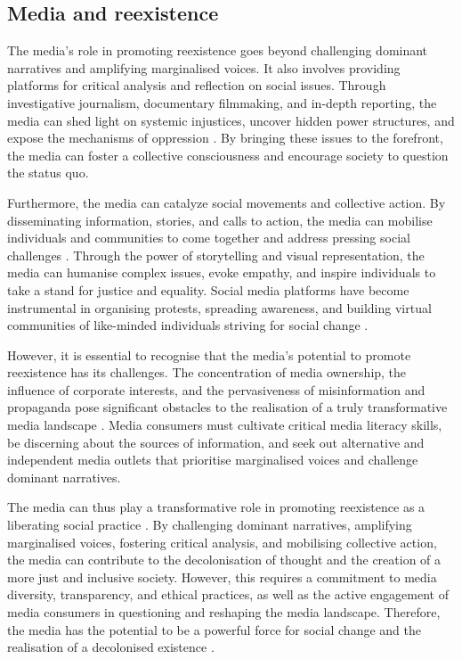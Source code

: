 \documentclass[english]{textolivre}
\begin{document}
\subsection{Media and reexistence}\label{sec-fmt-manuscrito}
The media’s role in promoting reexistence goes beyond challenging dominant narratives and amplifying marginalised voices. It also involves providing platforms for critical analysis and reflection on social issues. Through investigative journalism, documentary filmmaking, and in-depth reporting, the media can shed light on systemic injustices, uncover hidden power structures, and expose the mechanisms of oppression \cite{mcchesney2004problem}. By bringing these issues to the forefront, the media can foster a collective consciousness and encourage society to question the status quo.

Furthermore, the media can catalyze social movements and collective action. By disseminating information, stories, and calls to action, the media can mobilise individuals and communities to come together and address pressing social challenges \cite{couldry2012}. Through the power of storytelling and visual representation, the media can humanise complex issues, evoke empathy, and inspire individuals to take a stand for justice and equality. Social media platforms have become instrumental in organising protests, spreading awareness, and building virtual communities of like-minded individuals striving for social change \cite{hooks1996}.

However, it is essential to recognise that the media's potential to promote reexistence has its challenges. The concentration of media ownership, the influence of corporate interests, and the pervasiveness of misinformation and propaganda pose significant obstacles to the realisation of a truly transformative media landscape \cite{herman2002}. Media consumers must cultivate critical media literacy skills, be discerning about the sources of information, and seek out alternative and independent media outlets that prioritise marginalised voices and challenge dominant narratives.

The media can thus play a transformative role in promoting reexistence as a liberating social practice \cite{couldry2012}. By challenging dominant narratives, amplifying marginalised voices, fostering critical analysis, and mobilising collective action, the media can contribute to the decolonisation of thought and the creation of a more just and inclusive society. However, this requires a commitment to media diversity, transparency, and ethical practices, as well as the active engagement of media consumers in questioning and reshaping the media landscape. Therefore, the media has the potential to be a powerful force for social change and the realisation of a decolonised existence \cite{dahlgren2013}.
\end{document}
